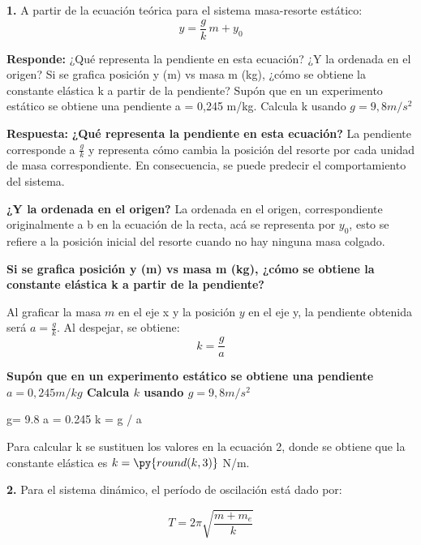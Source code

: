 
\textbf{1.} A partir de la ecuación teórica para el sistema masa-resorte estático:
\begin{equation}
    y = \frac{g}{k}\,m + y_{0}
\end{equation}

\textbf{Responde:} ¿Qué representa la pendiente en esta ecuación? ¿Y la ordenada en el origen?
Si se grafica posición y (m) vs masa m (kg), ¿cómo se obtiene la constante elástica
k a partir de la pendiente?
Supón que en un experimento estático se obtiene una pendiente a = 0,245 m/kg. Calcula
k usando $g = 9,8 m/s^ 2$


\textbf{Respuesta:}
\textbf{¿Qué representa la pendiente en esta ecuación?}
La pendiente corresponde a $\frac{g}{k}$ y representa cómo cambia la posición del
resorte por cada unidad de masa correspondiente. En consecuencia, se puede predecir
el comportamiento del sistema. 

\textbf{¿Y la ordenada en el origen?}
La ordenada en el origen, correspondiente originalmente a b en la ecuación de la recta, 
acá se representa por $y_0$, esto se refiere a la posición inicial del resorte cuando
no hay ninguna masa colgado. 

\textbf{Si se grafica posición y (m) vs masa m (kg), ¿cómo se obtiene la constante 
elástica k a partir de la pendiente?}

Al graficar la masa $m$ en el eje x y la posición $y$ en el eje y, la pendiente
obtenida será $a= \frac{g}{k}$. Al despejar, se obtiene: 
\begin{equation}
 k=\frac{g}{a}  
\end{equation}
 
\textbf{Supón que en un experimento estático se obtiene una pendiente $a = 0,245 m/kg$ 
Calcula $k$ usando $g = 9,8 m/s^ 2$}


\begin{pycode}
g= 9.8
a = 0.245
k = g / a

\end{pycode}

Para calcular k se sustituen los valores en la ecuación 2, donde se obtiene que 
la constante elástica es $k = \py{round(k, 3)}$ N/m.



\textbf{2.} Para el sistema dinámico, el período de oscilación está dado por: 

\begin{equation}
    T = 2 \pi \sqrt{\frac{m+m_e}{k}}
\end{equation}

